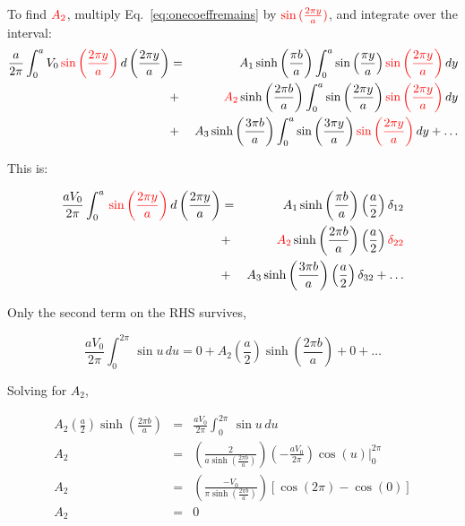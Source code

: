 \documentclass[12pt]{article}
\begin{document}
\begin{flushleft}
To find $\textcolor{red} {A_{2}}$, multiply Eq.~\ref{eq:onecoeffremains} by $\textcolor{red} {\sin{(\frac{2\pi y}{a})}}$, and integrate over the interval:
\begin{eqnarray*}
\frac{a}{2\pi}\int_{0}^{a} V_{0} \, \textcolor{red} {\sin{\left( \frac{2\pi y}{a} \right) }} \, d\left(\frac{2\pi y}{a}\right) & =  & A_{1} \sinh{\left(\frac{\pi b}{a}\right)} \int_{0}^{a} \sin{\left(\frac{\pi y}{a}\right)} \, \textcolor{red} {\sin{\left( \frac{2\pi y}{a} \right)}} \, dy \\
& + & \textcolor{red} {A_{2}} \sinh{\left(\frac{2\pi b}{a}\right)} \int_{0}^{a} \sin{\left(\frac{2\pi y}{a}\right)} \, \textcolor{red} {\sin{\left( \frac{2\pi y}{a} \right) }} \, dy \\
& + & A_{3}\sinh{ \left(\frac{3\pi b}{a}\right) }  \int_{0}^{a} \sin{ \left(\frac{3\pi y}{a}\right) } \, \textcolor{red} {\sin{\left( \frac{2\pi y}{a} \right) }} \, dy + \ldots
\end{eqnarray*}

 This is: 

\begin{eqnarray*}
\frac{aV_{0}}{2\pi}\int_{0}^{a} \, \textcolor{red} {\sin{\left( \frac{2\pi y}{a} \right) }} \, d\left(\frac{2\pi y}{a}\right) & =  & A_{1} \sinh{\left(\frac{\pi b}{a}\right)}\left( \frac{a}{2} \right)\delta_{12} \\
& + & \textcolor{red} {A_{2}} \sinh{\left(\frac{2\pi b}{a}\right)} \left( \frac{a}{2} \right)  \textcolor{red} {\delta_{22}} \\
& + & A_{3}\sinh{ \left(\frac{3\pi b}{a}\right) }\left( \frac{a}{2} \right)\delta_{32} + \ldots 
\end{eqnarray*}

Only the second term on the RHS survives,

 \begin{equation*}
 \frac{aV_{0}}{2\pi} \int_{0}^{2\pi} \, \sin{u} \, du = 0 + A_{2} \left( \frac{a}{2} \right) \sinh{\left(\frac{2\pi b}{a}\right)}  + 0 + \ldots 
\end{equation*}

Solving for $A_{2}$,

 \begin{eqnarray*}
 A_{2} \left( \frac{a}{2} \right) \sinh{\left(\frac{2\pi b}{a}\right)}  & = &   \frac{aV_{0}}{2\pi} \int_{0}^{2\pi} \, \sin{u} \, du \\[6pt]
 A_{2}  & = & \left(  \frac{2}{a \sinh{\left(\frac{2 \pi b}{a}\right)}} \right) \left(-\frac{aV_{0}}{2\pi}\right)  \left. \cos{(u)} \right\vert_{0}^{2\pi} \\[6pt]
A_{2} & = &  \left(  \frac{-V_{0}}{\pi \sinh{\left(\frac{2 \pi b}{a}\right)}} \right) \left[ \cos{(2\pi)} - \cos{(0)} \right] \\[6pt]
A_{2} & = &  0 \\
\end{eqnarray*}
 

\end{flushleft}
\end{document}
